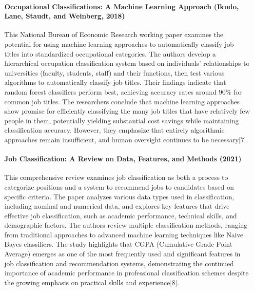 \documentclass[./main.tex]{subfiles}
\begin{document}
\paragraph{Occupational Classifications: A Machine Learning Approach
(Ikudo, Lane, Staudt, and Weinberg,
2018)}\label{occupational-classifications-a-machine-learning-approach-ikudo-lane-staudt-and-weinberg-2018}

This National Bureau of Economic Research working paper examines the
potential for using machine learning approaches to automatically
classify job titles into standardized occupational categories. The
authors develop a hierarchical occupation classification system based on
individuals' relationships to universities (faculty, students, staff)
and their functions, then test various algorithms to automatically
classify job titles. Their findings indicate that random forest
classifiers perform best, achieving accuracy rates around 90\% for
common job titles. The researchers conclude that machine learning
approaches show promise for efficiently classifying the many job titles
that have relatively few people in them, potentially yielding
substantial cost savings while maintaining classification accuracy.
However, they emphasize that entirely algorithmic approaches remain
insufficient, and human oversight continues to be necessary{[}7{]}.

\paragraph{Job Classification: A Review on Data, Features, and
Methods
(2021)}\label{job-classification-a-review-on-data-features-and-methods-2021}

This comprehensive review examines job classification as both a process
to categorize positions and a system to recommend jobs to candidates
based on specific criteria. The paper analyzes various data types used
in classification, including nominal and numerical data, and explores
key features that drive effective job classification, such as academic
performance, technical skills, and demographic factors. The authors
review multiple classification methods, ranging from traditional
approaches to advanced machine learning techniques like Naive Bayes
classifiers. The study highlights that CGPA (Cumulative Grade Point
Average) emerges as one of the most frequently used and significant
features in job classification and recommendation systems, demonstrating
the continued importance of academic performance in professional
classification schemes despite the growing emphasis on practical skills
and experience{[}8{]}.
\end{document}
